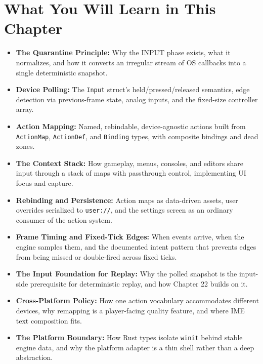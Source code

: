 \documentclass[
  11pt,
  letterpaper,
  DIV=11,
  numbers=noendperiod,
  twoside,
  open=right]{scrreprt}
\providecommand{\tightlist}{%
  \setlength{\itemsep}{0pt}\setlength{\parskip}{0pt}}
\begin{document}
\section*{What You Will Learn in This
Chapter}\label{what-you-will-learn-in-this-chapter-4}


\begin{itemize}
\tightlist
\item
  \textbf{The Quarantine Principle:} Why the INPUT phase exists, what it
  normalizes, and how it converts an irregular stream of OS callbacks
  into a single deterministic snapshot.
\item
  \textbf{Device Polling:} The \texttt{Input} struct's
  held/pressed/released semantics, edge detection via previous-frame
  state, analog inputs, and the fixed-size controller array.
\item
  \textbf{Action Mapping:} Named, rebindable, device-agnostic actions
  built from \texttt{ActionMap}, \texttt{ActionDef}, and
  \texttt{Binding} types, with composite bindings and dead zones.
\item
  \textbf{The Context Stack:} How gameplay, menus, consoles, and editors
  share input through a stack of maps with passthrough control,
  implementing UI focus and capture.
\item
  \textbf{Rebinding and Persistence:} Action maps as data-driven assets,
  user overrides serialized to \texttt{user://}, and the settings screen
  as an ordinary consumer of the action system.
\item
  \textbf{Frame Timing and Fixed-Tick Edges:} When events arrive, when
  the engine samples them, and the documented intent pattern that
  prevents edges from being missed or double-fired across fixed ticks.
\item
  \textbf{The Input Foundation for Replay:} Why the polled snapshot is
  the input-side prerequisite for deterministic replay, and how Chapter
  22 builds on it.
\item
  \textbf{Cross-Platform Policy:} How one action vocabulary accommodates
  different devices, why remapping is a player-facing quality feature,
  and where IME text composition fits.
\item
  \textbf{The Platform Boundary:} How Rust types isolate \texttt{winit}
  behind stable engine data, and why the platform adapter is a thin
  shell rather than a deep abstraction.
\end{itemize}
\end{document}
